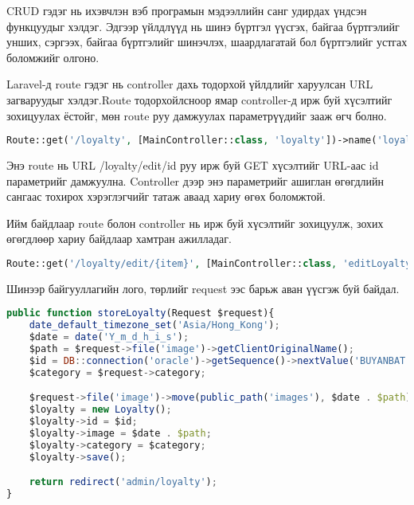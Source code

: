 CRUD гэдэг нь ихэвчлэн вэб програмын мэдээллийн санг удирдах үндсэн функцуудыг хэлдэг.
Эдгээр үйлдлүүд нь шинэ бүртгэл үүсгэх, байгаа бүртгэлийг унших, сэргээх, байгаа бүртгэлийг шинэчлэх, шаардлагатай бол бүртгэлийг устгах боломжийг олгоно.

Laravel-д route гэдэг нь controller дахь тодорхой үйлдлийг харуулсан URL загваруудыг хэлдэг.Route тодорхойлсноор ямар controller-д ирж буй хүсэлтийг зохицуулах ёстойг, мөн route руу дамжуулах параметрүүдийг зааж өгч болно.

\begin{lstlisting}[language=php, caption=web.php буюу route, frame=single]
Route::get('/loyalty', [MainController::class, 'loyalty'])->name('loyalties');
\end{lstlisting}

Энэ route нь URL /loyalty/edit/{id} руу ирж буй GET хүсэлтийг URL-аас {id} параметрийг дамжуулна. Controller дээр энэ параметрийг ашиглан өгөгдлийн сангаас тохирох хэрэглэгчийг татаж аваад хариу өгөх боломжтой.

Ийм байдлаар route болон controller нь ирж буй хүсэлтийг зохицуулж, зохих өгөгдлөөр хариу байдлаар хамтран ажилладаг.

\begin{lstlisting}[language=php, caption=Route example, frame=single]
Route::get('/loyalty/edit/{item}', [MainController::class, 'editLoyalty'])->name('EditLoyalties');
\end{lstlisting}

Шинээр байгууллагийн лого, төрлийг request ээс барьж аван үүсгэж буй байдал.

\begin{lstlisting}[language=Javascript, caption=Creating new logo and category, frame=single]
public function storeLoyalty(Request $request){
    date_default_timezone_set('Asia/Hong_Kong');
    $date = date('Y_m_d_h_i_s');
    $path = $request->file('image')->getClientOriginalName();
    $id = DB::connection('oracle')->getSequence()->nextValue('BUYANBAT.LOYALTY_ID_SEQ');
    $category = $request->category;

    $request->file('image')->move(public_path('images'), $date . $path);
    $loyalty = new Loyalty();
    $loyalty->id = $id;
    $loyalty->image = $date . $path;
    $loyalty->category = $category;
    $loyalty->save();

    return redirect('admin/loyalty');
}
\end{lstlisting}
\pagebreak